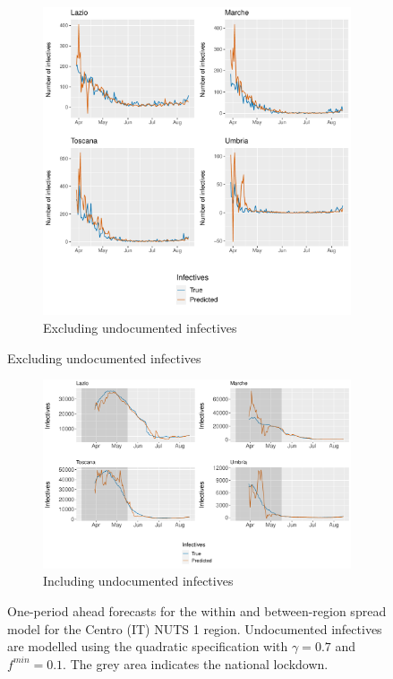 \documentclass[12pt]{article}
\begin{document}
\begin{appendices}
        \begin{figure}[H]
    	    \centering
    	    \begin{subfigure}{\textwidth}
    	      \centering
    	      \includegraphics[width=0.94\linewidth]{output/model_between_lag14_forecast_start20_Centro (IT)_rolling.pdf}
    	      \caption{Excluding undocumented infectives}
    	      \label{fig:forecast_between_centro_regular}
    	    \end{subfigure}
        \end{figure}
        \begin{figure}[H]\ContinuedFloat
    	    \begin{subfigure}{\textwidth}
    	      \centering
    	      \includegraphics[width=0.94\linewidth]{output/model_between_lag14_forecast_start20_Centro (IT)_UndocQuadratic_rolling.pdf}
    	      \caption{Including undocumented infectives}
    	      \label{fig:forecast_between_centro_undoc}
    	    \end{subfigure}
    	    \caption{One-period ahead forecasts for the within and between-region spread model for the Centro (IT) NUTS 1 region. Undocumented infectives are modelled using the quadratic specification with $\gamma = 0.7$ and $f^{min}=0.1$. The grey area indicates the national lockdown.}
    	    \label{fig:forecast_between_centro}
        \end{figure}
        

\end{appendices}
\end{document}
